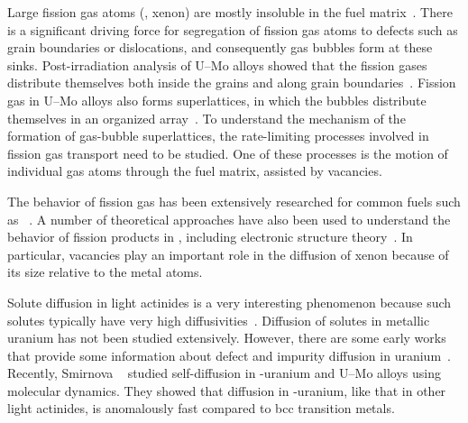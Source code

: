 Large fission gas atoms (\ie, xenon) are mostly insoluble in the fuel
matrix~\cite{grimes1991stability,andersson2011u}. There is a significant
driving force for segregation of fission gas atoms to defects such as grain
boundaries or dislocations, and consequently gas bubbles form at these sinks.
Post-irradiation analysis of U--Mo alloys showed that the fission gases
distribute themselves both inside the grains and along grain
boundaries~\cite{miller2012advantages, miller2015transmission,
gan2010transmission, gan2012tem}. Fission gas in U--Mo alloys also forms
superlattices, in which the bubbles distribute themselves in an organized
array~\cite{gan2012tem,van2008transmission}. To understand the mechanism of
the formation of gas-bubble superlattices, the rate-limiting processes
involved in fission gas transport need to be studied. One of these processes is
the motion of individual gas atoms through the fuel matrix, assisted by
vacancies.

The behavior of fission gas
has been extensively researched for common fuels such as
~\cite{yun2008atomic,carter1972xenon,matzke1966diffusion,
    macewan1964xenon, une1987effects}.
A number of theoretical approaches have also been used to understand the
behavior of fission products in , including electronic structure
theory~\cite{catlow1978fission,jackson1986calculation,grimes1989calculations,
    ball1990diffusion,grimes1991stability, petit1999location,
    crocombette2002ab, freyss2006ab, andersson2011u}.
In particular, vacancies play an important role in the diffusion of xenon
because of its size relative to the metal atoms.

Solute diffusion in light actinides is a very interesting phenomenon because
such solutes typically have very high
diffusivities~\cite{neumann2011self,paul2017handbook, agarwala1992}.
Diffusion of solutes in metallic uranium has not been studied extensively.
However, there are some early works that provide some information about defect
and impurity diffusion in uranium~\cite{adda1959etude,peterson1964diffusion,
    rothman1959self, rothman1961diffusion, adda1962etude, resnick1962self,
    rothman1961self, liu2012atomic}.
Recently, Smirnova \etal~\cite{smirnova2015atomistic} studied self-diffusion in
\textgamma-uranium and U--Mo alloys using molecular dynamics.
They showed that diffusion in \textgamma-uranium, like that in other light
actinides, is anomalously fast compared to bcc transition metals.

